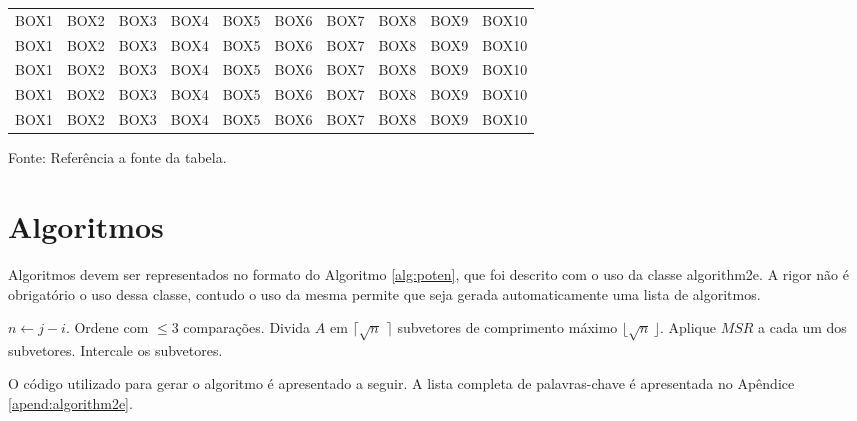 \begin{landscape}
\begin{longtable}[c]{c|c|c|c|c|c|c|c|c|c}
	BOX1 & BOX2 & BOX3 & BOX4 & BOX5 & BOX6 &	BOX7 & BOX8 & BOX9 & BOX10 \\
	BOX1 & BOX2 & BOX3 & BOX4 & BOX5 & BOX6 &	BOX7 & BOX8 & BOX9 & BOX10 \\
	BOX1 & BOX2 & BOX3 & BOX4 & BOX5 & BOX6 &	BOX7 & BOX8 & BOX9 & BOX10 \\
	BOX1 & BOX2 & BOX3 & BOX4 & BOX5 & BOX6 &	BOX7 & BOX8 & BOX9 & BOX10 \\
	BOX1 & BOX2 & BOX3 & BOX4 & BOX5 & BOX6 &	BOX7 & BOX8 & BOX9 & BOX10 \\
\hline
\end{longtable}
\vspace{-8mm}
\begin{center}
\footnotesize
Fonte: Referência a fonte da tabela.
\end{center}
\end{landscape}

\section{Algoritmos}
\label{sec:algor} 
Algoritmos devem ser representados no formato do Algoritmo \ref{alg:poten}, que foi descrito com o uso da classe \textsf{algorithm2e}. A rigor não é obrigatório o uso dessa classe, contudo o uso da mesma permite que seja gerada automaticamente uma lista de algoritmos.

\medskip
\begin{center}
\begin{minipage}{0.92\textwidth}
\begin{algorithm2e}[H]
 \DontPrintSemicolon
 \LinesNumbered
 \SetAlgoLined
 \BlankLine
 \BlankLine
 $n \leftarrow j - i$.\;
   {Ordene com $\leq 3$ comparações.}
   {Divida $A$ em $\lceil\sqrt{n}\,\,\rceil$ subvetores de comprimento máximo $\lfloor\sqrt{n}\,\rfloor$.\;
    Aplique $MSR$ a cada um dos subvetores.\;
    Intercale os subvetores.\;}
\caption{$MSR(A,i,j)$ \label {alg:poten}}
\end{algorithm2e}
\end{minipage}
\end{center}

O código utilizado para gerar o algoritmo é apresentado a seguir. A lista completa de palavras-chave é apresentada no Apêndice \ref{apend:algorithm2e}.

